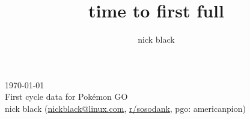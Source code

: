 \documentclass[ebook,10pt,openany,oneside]{memoir}
\title{time to first full}
\author{nick black}
\begin{document}
\noindent{}\today\\
First cycle data for Pokémon GO\\
nick black (\href{mailto:nickblack@linux.com}{nickblack@linux.com}, \href{https://www.reddit.com/user/sosodank/}{r/sosodank}, pgo: americanpion)\\
\bigskip

\footnotesize
\setlength{\tabcolsep}{2pt}

\end{document}
